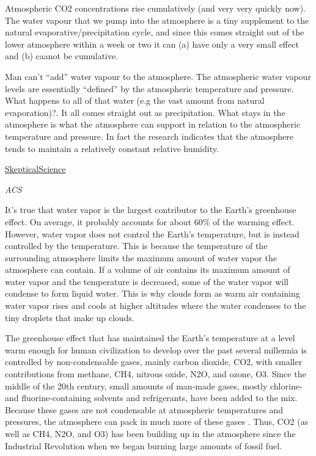 \documentclass[
]{book}
\begin{document}
Atmospheric CO2 concentrations rise cumulatively (and very very quickly now).
The water vapour that we pump into the atmosphere is a tiny supplement to the natural evaporative/precipitation cycle, and since this comes straight out of the lower atmosphere within a week or two it can (a) have only a very small effect and (b) caanot be cumulative.

Man can't ``add'' water vapour to the atmosphere. The atmospheric water vapour levels are essentially ``defined'' by the atmospheric temperature and pressure.
What happens to all of that water (e.g the vast amount from natural evaporation)?. It all comes straight out as precipitation. What stays in the atmosphere is what the atmosphere can support in relation to the atmospheric temperature and pressure. In fact the research indicates that the atmosphere tends to maintain a relatively constant relative humidity.

\href{https://skepticalscience.com/water-vapor-greenhouse-gas.htm}{SkepticalScience}

\emph{ACS}

It's true that water vapor is the largest contributor to the Earth's greenhouse effect. On average, it probably accounts for about 60\% of the warming effect. However, water vapor does not control the Earth's temperature, but is instead controlled by the temperature. This is because the temperature of the surrounding atmosphere limits the maximum amount of water vapor the atmosphere can contain. If a volume of air contains its maximum amount of water vapor and the temperature is decreased, some of the water vapor will condense to form liquid water. This is why clouds form as warm air containing water vapor rises and cools at higher altitudes where the water condenses to the tiny droplets that make up clouds.

The greenhouse effect that has maintained the Earth's temperature at a level warm enough for human civilization to develop over the past several millennia is controlled by non-condensable gases, mainly carbon dioxide, CO2, with smaller contributions from methane, CH4, nitrous oxide, N2O, and ozone, O3. Since the middle of the 20th century, small amounts of man-made gases, mostly chlorine- and fluorine-containing solvents and refrigerants, have been added to the mix. Because these gases are not condensable at atmospheric temperatures and pressures, the atmosphere can pack in much more of these gases . Thus, CO2 (as well as CH4, N2O, and O3) has been building up in the atmosphere since the Industrial Revolution when we began burning large amounts of fossil fuel.
\end{document}
